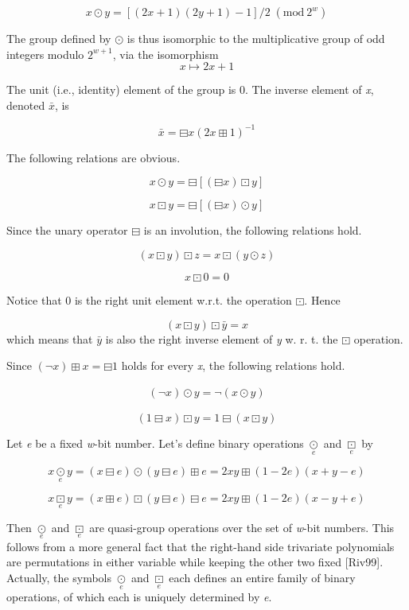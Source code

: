 \documentclass[a4paper,oneside,english]{amsart}
\numberwithin{equation}{section}
\numberwithin{figure}{section}
\begin{document}
\[
x\odot y=\left[(2x+1)(2y+1)-1\right]/2\;(\mathrm{\textrm{mod}\:}2^{w})
\]


The group defined by $\odot$ is thus isomorphic to the multiplicative
group of odd integers modulo $2^{w+1}$, via the isomorphism 
\[
x\mapsto2x+1
\]


The unit (i.e., identity) element of the group is 0. The inverse element
of \emph{x}, denoted $\bar{x}$, is 

\[
\bar{x}=\boxminus x(2x\boxplus1)^{-1}
\]


The following relations are obvious. 

\[
x\odot y=\boxminus\left[(\boxminus x)\boxdot y\right]
\]


\[
x\boxdot y=\boxminus\left[(\boxminus x)\odot y\right]
\]


Since the unary operator $\boxminus$ is an involution, the following
relations hold.

\[
(x\boxdot y)\boxdot z=x\boxdot(y\odot z)
\]


\[
x\boxdot0=0
\]


Notice that 0 is the right unit element w.r.t. the operation $\boxdot$.
Hence

\[
(x\boxdot y)\boxdot\bar{y}=x
\]
which means that $\bar{y}$ is also the right inverse element of \emph{y}
w. r. t. the $\boxdot$ operation. 

Since $(\neg x)\boxplus x=\boxminus1$ holds for every \emph{x}, the
following relations hold.

\begin{gather*}
(\neg x)\odot y=\neg(x\odot y)
\end{gather*}


\[
(1\boxminus x)\boxdot y=1\boxminus(x\boxdot y)
\]


Let \emph{e} be a fixed \emph{w}-bit number. Let's define binary operations
$\underset{e}{\odot}$ and $\underset{e}{\boxdot}$ by 

\[
x\underset{e}{\odot}y=(x\boxminus e)\odot(y\boxminus e)\boxplus e=2xy\boxplus(1-2e)(x+y-e)
\]


\[
x\underset{e}{\boxdot}y=(x\boxplus e)\boxdot(y\boxminus e)\boxminus e=2xy\boxplus(1-2e)(x-y+e)
\]


Then $\underset{e}{\odot}$ and $\underset{e}{\boxdot}$ are quasi-group
operations over the set of \emph{w}-bit numbers. This follows from
a more general fact that the right-hand side trivariate polynomials
are permutations in either variable while keeping the other two fixed
{[}Riv99{]}. Actually, the symbols $\underset{e}{\odot}$ and $\underset{e}{\boxdot}$
each defines an entire family of binary operations, of which each
is uniquely determined by \emph{e}.
\end{document}
